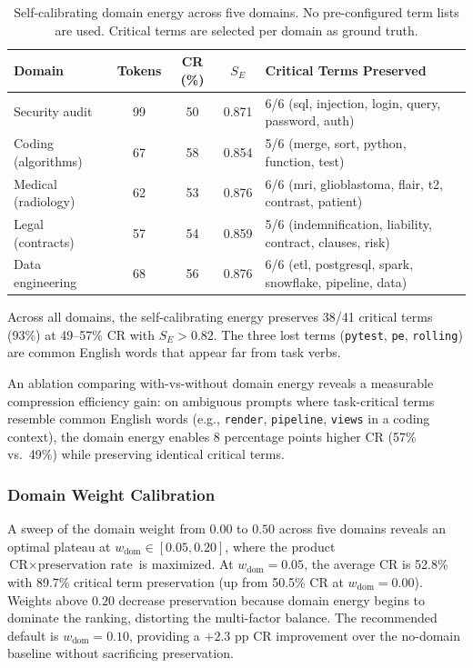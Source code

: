 \documentclass[11pt]{article}
\theoremstyle{remark}
\begin{document}
\begin{table}[H]
\centering
\caption{Self-calibrating domain energy across five domains. No pre-configured
term lists are used. Critical terms are selected per domain as ground truth.}
\label{tab:domain-results}
\begin{tabular}{lcccl}
\toprule
Domain & Tokens & CR (\%) & $S_E$ & Critical Terms Preserved \\
\midrule
Security audit   & 99  & 50 & 0.871 & 6/6 (sql, injection, login, query, password, auth) \\
Coding (algorithms) & 67 & 58 & 0.854 & 5/6 (merge, sort, python, function, test) \\
Medical (radiology) & 62 & 53 & 0.876 & 6/6 (mri, glioblastoma, flair, t2, contrast, patient) \\
Legal (contracts)   & 57 & 54 & 0.859 & 5/6 (indemnification, liability, contract, clauses, risk) \\
Data engineering & 68 & 56 & 0.876 & 6/6 (etl, postgresql, spark, snowflake, pipeline, data) \\
\bottomrule
\end{tabular}
\end{table}

Across all domains, the self-calibrating energy preserves 38/41 critical
terms (93\%) at 49--57\% CR with $S_E > 0.82$. The three lost terms
(\texttt{pytest}, \texttt{pe}, \texttt{rolling}) are common English words
that appear far from task verbs.

An ablation comparing with-vs-without domain energy reveals a measurable
compression efficiency gain: on ambiguous prompts where task-critical terms
resemble common English words (e.g., \texttt{render}, \texttt{pipeline},
\texttt{views} in a coding context), the domain energy enables 8 percentage
points higher CR (57\% vs.\ 49\%) while preserving identical critical
terms.

\subsubsection{Domain Weight Calibration}

A sweep of the domain weight from $0.00$ to $0.50$ across five domains
reveals an optimal plateau at $w_{\text{dom}} \in [0.05, 0.20]$, where
the product $\text{CR} \times \text{preservation rate}$ is maximized.
At $w_{\text{dom}} = 0.05$, the average CR is 52.8\% with 89.7\% critical
term preservation (up from 50.5\% CR at $w_{\text{dom}} = 0.00$). Weights
above $0.20$ decrease preservation because domain energy begins to dominate
the ranking, distorting the multi-factor balance. The recommended default
is $w_{\text{dom}} = 0.10$, providing a $+2.3$ pp CR improvement over the
no-domain baseline without sacrificing preservation.
\end{document}
